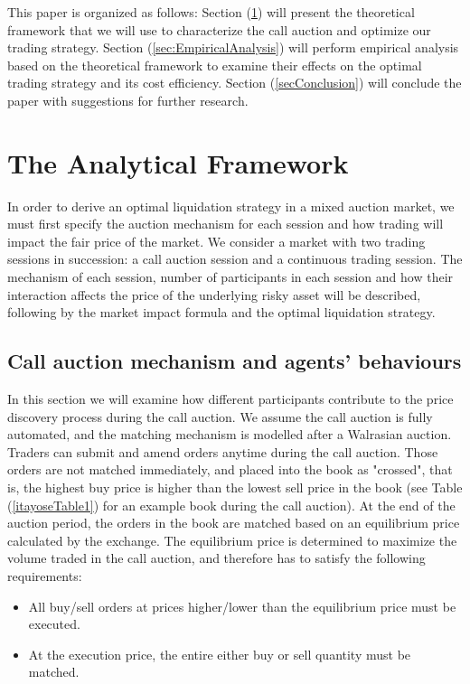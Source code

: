 \documentclass{article}
\begin{document}
This paper is organized as follows: Section (\ref{sec:AnalyticalFramework}) will present the theoretical framework that we will use to characterize the call auction and optimize our trading strategy. Section (\ref{sec:EmpiricalAnalysis}) will perform empirical analysis based on the theoretical framework to examine their effects on the optimal trading strategy and its cost efficiency. Section (\ref{secConclusion}) will conclude the paper with suggestions for further research.

\section{The Analytical Framework}\label{sec:AnalyticalFramework}

In order to derive an optimal liquidation strategy in a mixed auction market, we must first specify the auction mechanism for each session and how trading will impact the fair price of the market. We consider a market with two trading sessions in succession: a call auction session and a continuous trading session. The mechanism of each session, number of participants in each session and how their interaction affects the price of the underlying risky asset will be described, following by the market impact formula and the optimal liquidation strategy.

\subsection{Call auction mechanism and agents' behaviours}\label{subsec:AnalyticalFrameworkCallAuction}

In this section we will examine how different participants contribute to the price discovery process during the call auction. We assume the call auction is fully automated, and the matching mechanism is modelled after a Walrasian auction. Traders can submit and amend orders anytime during the call auction. Those orders are not matched immediately, and placed into the book as "crossed", that is, the highest buy price is higher than the lowest sell price in the book (see Table (\ref{itayoseTable1}) for an example book during the call auction). At the end of the auction period, the orders in the book are matched based on an equilibrium price calculated by the exchange. The equilibrium price is determined to maximize the volume traded in the call auction, and therefore has to satisfy the following requirements:

\begin{itemize}
  \item All buy/sell orders at prices higher/lower than the equilibrium price must be executed.
  \item At the execution price, the entire either buy or sell quantity must be matched.
\end{itemize}
\end{document}
